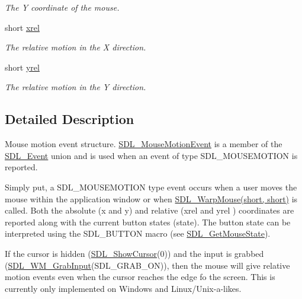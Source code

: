 \begin{DoxyCompactItemize}
\begin{DoxyCompactList}\small\item\em The Y coordinate of the mouse. \item\end{DoxyCompactList}\item 
short \hyperlink{struct_tao_1_1_sdl_1_1_sdl_1_1_s_d_l___mouse_motion_event_ab8dbb38820da1b901feeda37d501b0c4}{xrel}
\begin{DoxyCompactList}\small\item\em The relative motion in the X direction. \item\end{DoxyCompactList}\item 
short \hyperlink{struct_tao_1_1_sdl_1_1_sdl_1_1_s_d_l___mouse_motion_event_ac5098052e2663cc8ce48dd8f309ca28f}{yrel}
\begin{DoxyCompactList}\small\item\em The relative motion in the Y direction. \item\end{DoxyCompactList}\end{DoxyCompactItemize}


\subsection{Detailed Description}
Mouse motion event structure. \hyperlink{struct_tao_1_1_sdl_1_1_sdl_1_1_s_d_l___mouse_motion_event}{SDL\_\-MouseMotionEvent} is a member of the \hyperlink{struct_tao_1_1_sdl_1_1_s_d_l___event}{SDL\_\-Event} union and is used when an event of type SDL\_\-MOUSEMOTION is reported. 

Simply put, a SDL\_\-MOUSEMOTION type event occurs when a user moves the mouse within the application window or when \hyperlink{_sdl_8cs_a1f870df2b13fdb36e3ea8a10aab057ca}{SDL\_\-WarpMouse(short, short)} is called. Both the absolute (x and y) and relative (xrel and yrel ) coordinates are reported along with the current button states (state). The button state can be interpreted using the SDL\_\-BUTTON macro (see \hyperlink{_sdl_8cs_a5f331fd789dbcc61437a6fe406b4454f}{SDL\_\-GetMouseState}). 

If the cursor is hidden (\hyperlink{_sdl_8cs_a4e85211428ccac72ba71d06b2391ab06}{SDL\_\-ShowCursor}(0)) and the input is grabbed (\hyperlink{_sdl_8cs_ad70ae8fd84dc3156a6d670ae8532da28}{SDL\_\-WM\_\-GrabInput}(SDL\_\-GRAB\_\-ON)), then the mouse will give relative motion events even when the cursor reaches the edge fo the screen. This is currently only implemented on Windows and Linux/Unix-\/a-\/likes. 

